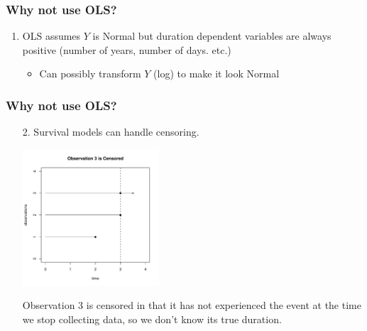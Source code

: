 \documentclass[handout]{beamer}
\begin{document}
\begin{frame}
\frametitle{Why not use OLS?}
\pause
\begin{enumerate}
\item OLS assumes $Y$ is Normal but duration dependent variables are
always positive (number of years, number of days. etc.)
\pause
\begin{itemize}
\item Can possibly transform $Y$ (log) to make it look Normal
\end{itemize}
\pause

\begin{figure}[!htp]
\begin{center}
\end{center}
\end{figure}
\end{enumerate}
\end{frame}

\begin{frame}
\frametitle{Why not use OLS?}

\begin{enumerate}
\item[2.] Survival models can handle censoring.
\pause
\begin{center}
\includegraphics[width = 2in, height = 2in]{survival_present-censor.pdf}
\end{center}
\pause
Observation 3 is censored in that it has not experienced the event at
the time we stop collecting data, so we don't know its true duration.
\end{enumerate}
\end{frame}
\end{document}

